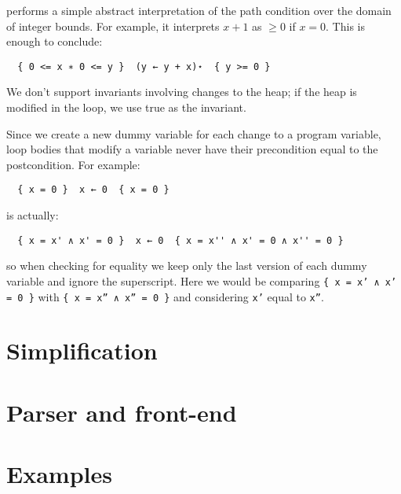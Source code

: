 \documentclass{scrartcl}
\begin{document}
 performs a simple abstract interpretation of the path condition over the domain of integer bounds. For example, it interprets \(x + 1\) as \(\geq 0\) if \(x = 0\). This is enough to conclude:
\begin{verbatim}
  { 0 <= x ∗ 0 <= y }  (y ← y + x)⋆  { y >= 0 }
\end{verbatim}

We don't support invariants involving changes to the heap; if the heap is modified in the loop, we use true as the invariant.

Since we create a new dummy variable for each change to a program variable, loop bodies that modify a variable never have their precondition equal to the postcondition. For example:
\begin{verbatim}
  { x = 0 }  x ← 0  { x = 0 }
\end{verbatim}
is actually:
\begin{verbatim}
  { x = x' ∧ x' = 0 }  x ← 0  { x = x'' ∧ x' = 0 ∧ x'' = 0 }
\end{verbatim}
so when checking for equality we keep only the last version of each dummy variable and ignore the superscript. Here we would be comparing \texttt{\{ x = x' ∧ x' = 0 \}} with \texttt{\{ x = x'' ∧ x'' = 0 \}} and considering \texttt{x'} equal to \texttt{x''}.

\section{Simplification}

\section{Parser and front-end}

\section{Examples}
\end{document}
